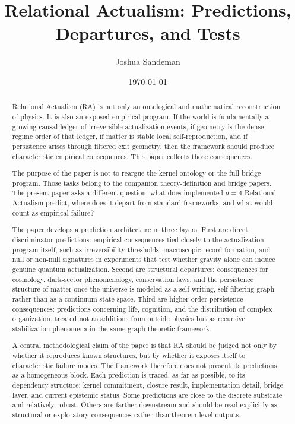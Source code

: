 \documentclass[11pt]{article}
\title{Relational Actualism: Predictions, Departures, and Tests}
\author{Joshua Sandeman}
\date{\today}
\begin{document}
\maketitle

\begin{abstract}
Relational Actualism (RA) is not only an ontological and mathematical reconstruction of physics. It is also an exposed empirical program. If the world is fundamentally a growing causal ledger of irreversible actualization events, if geometry is the dense-regime order of that ledger, if matter is stable local self-reproduction, and if persistence arises through filtered exit geometry, then the framework should produce characteristic empirical consequences. This paper collects those consequences.

The purpose of the paper is not to reargue the kernel ontology or the full bridge program. Those tasks belong to the companion theory-definition and bridge papers. The present paper asks a different question: what does implemented $d=4$ Relational Actualism predict, where does it depart from standard frameworks, and what would count as empirical failure?

The paper develops a prediction architecture in three layers. First are direct discriminator predictions: empirical consequences tied closely to the actualization program itself, such as irreversibility thresholds, macroscopic record formation, and null or non-null signatures in experiments that test whether gravity alone can induce genuine quantum actualization. Second are structural departures: consequences for cosmology, dark-sector phenomenology, conservation laws, and the persistence structure of matter once the universe is modeled as a self-writing, self-filtering graph rather than as a continuum state space. Third are higher-order persistence consequences: predictions concerning life, cognition, and the distribution of complex organization, treated not as additions from outside physics but as recursive stabilization phenomena in the same graph-theoretic framework.

A central methodological claim of the paper is that RA should be judged not only by whether it reproduces known structures, but by whether it exposes itself to characteristic failure modes. The framework therefore does not present its predictions as a homogeneous block. Each prediction is traced, as far as possible, to its dependency structure: kernel commitment, closure result, implementation detail, bridge layer, and current epistemic status. Some predictions are close to the discrete substrate and relatively robust. Others are farther downstream and should be read explicitly as structural or exploratory consequences rather than theorem-level outputs.


\end{abstract}
\end{document}

